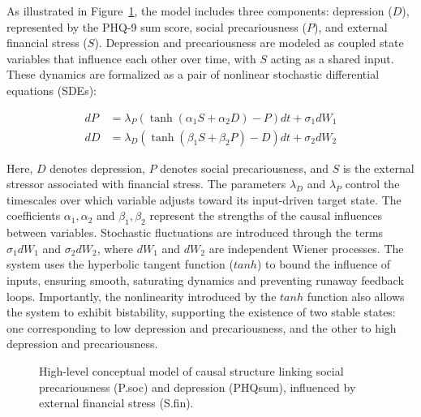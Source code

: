 \documentclass[
]{article}
\begin{document}
As illustrated in Figure~\ref{fig-concept}, the model includes three
components: depression (\(D\)), represented by the PHQ-9 sum score,
social precariousness (\(P\)), and external financial stress (\(S\)).
Depression and precariousness are modeled as coupled state variables
that influence each other over time, with \(S\) acting as a shared
input. These dynamics are formalized as a pair of nonlinear stochastic
differential equations (SDEs):

\[
\begin{aligned}
dP &= \lambda_P \left( \tanh(\alpha_1 S + \alpha_2 D) - P \right) dt + \sigma_1 dW_1 \\
dD &= \lambda_D \left( \tanh(\beta_1 S + \beta_2 P) - D \right) dt + \sigma_2 dW_2 
\end{aligned}
\]

Here, \(D\) denotes depression, \(P\) denotes social precariousness, and
\(S\) is the external stressor associated with financial stress. The
parameters \(\lambda_D\) and \(\lambda_P\) control the timescales over
which variable adjusts toward its input-driven target state. The
coefficients \(\alpha_1, \alpha_2\) and \(\beta_1, \beta_2\) represent
the strengths of the causal influences between variables. Stochastic
fluctuations are introduced through the terms \(\sigma_1 dW_1\) and
\(\sigma_2 dW_2\), where \(dW_1\) and \(dW_2\) are independent Wiener
processes. The system uses the hyperbolic tangent function (\(tanh\)) to
bound the influence of inputs, ensuring smooth, saturating dynamics and
preventing runaway feedback loops. Importantly, the nonlinearity
introduced by the \(tanh\) function also allows the system to exhibit
bistability, supporting the existence of two stable states: one
corresponding to low depression and precariousness, and the other to
high depression and precariousness.

\begin{figure}


\caption{\label{fig-concept}High-level conceptual model of causal
structure linking social precariousness (P.soc) and depression (PHQsum),
influenced by external financial stress (S.fin).}

\end{figure}%
\end{document}
